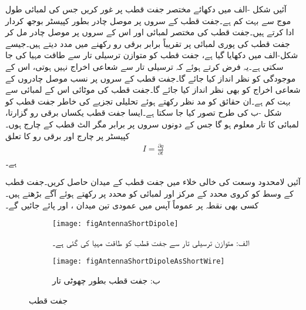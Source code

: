 آئیں شکل -الف میں دکھائے مختصر جفت قطب پر غور کریں جس کی لمبائی  طول موج سے بہت کم  ہے۔جفت قطب کے سروں پر موصل چادر بطور  کپیسٹر  بوجھ کردار ادا کرتے ہیں۔جفت قطب کی مختصر لمبائی اور اس کے سروں پر موصل چادر مل کر جفت قطب  کی پوری لمبائی پر تقریباً برابر برقی رو رکھنے میں مدد دیتے ہیں۔جیسے شکل-الف میں دکھایا گیا ہے، جفت قطب کو متوازن ترسیلی تار سے طاقت مہیا کی جا سکتی ہے۔یہ فرض کرتے ہوئے کہ ترسیلی تار سے شعاعی اخراج نہیں ہوتی، اس کے موجودگی کو نظر انداز کیا جائے گا۔جفت قطب کے سروں پر نسب موصل چادروں کے شعاعی اخراج کو بھی نظر انداز کیا جائے گا۔جفت قطب کی موٹائی  اس کے لمبائی سے بہت کم  ہے۔ان حقائق کو مد نظر رکھتے ہوئے تحلیلی تجزیے کی خاطر جفت قطب کو شکل -ب کی طرح تصور کیا جا سکتا ہے۔ایسا جفت قطب یکساں برقی رو  گزارتا،  لمبائی کا تار معلوم ہو گا جس کے دونوں سروں پر برابر مگر الٹ قطب کے چارج  ہوں۔کپیسٹر پر چارج  اور برقی رو  کا تعلق
\begin{align}\label{مساوات_اینٹینا_رو_اور_چارج}
I=\frac{\partial q}{\partial t}
\end{align}
ہے۔ 

آئیں لامحدود وسعت کی خالی خلاء میں جفت قطب کے میدان حاصل کریں۔جفت قطب کے وسط کو کروی محدد کے مرکز اور لمبائی کو  محدد پر رکھتے ہوئے آگے بڑھتے ہیں۔کسی بھی نقطہ  پر عموماً آپس میں عمودی تین میدان ،  اور  پائے جائیں گے۔

\begin{figure}
\centering
\begin{subfigure}{0.4\textwidth}
\centering
\texttt{[image: figAntennaShortDipole]}
\caption*{الف: متوازن ترسیلی تار سے جفت قطب کو طاقت مہیا کی گئی ہے۔}
\end{subfigure}%
%
\begin{subfigure}{0.4\textwidth}
\centering
\texttt{[image: figAntennaShortDipoleAsShortWire]}
\caption*{ب: جفت قطب بطور چھوٹی تار}
\end{subfigure}%
\caption{جفت قطب}
\label{شکل_اینٹینا_جفت_قطب}
\end{figure}


